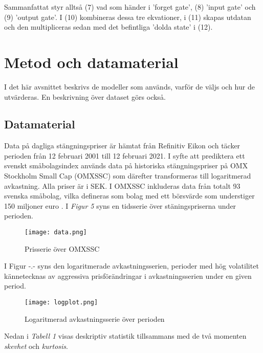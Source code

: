 \documentclass[12pt]{article}
\begin{document}
Sammanfattat styr alltså (7) vad som händer i 'forget gate', (8) 'input gate' och (9) 'output gate'. I (10) kombineras dessa tre ekvationer, i (11) skapas utdatan och den multipliceras sedan med det befintliga 'dolda state' i (12). 


\section{Metod och datamaterial}
I det här avsnittet beskrivs de modeller som används, varför de väljs och hur de utvärderas. En beskrivning över dataset görs också. 

\subsection{Datamaterial}

Data på dagliga stängningspriser är hämtat från Refinitiv Eikon och täcker perioden från 12 februari 2001 till 12 februari 2021. I syfte att prediktera ett svenskt småbolagsindex används data på historiska stängningspriser på OMX Stockholm Small Cap (OMXSSC) som därefter transformeras till logaritmerad avkastning. Alla priser är i SEK. I OMXSSC inkluderas data från totalt 93 svenska småbolag, vilka defineras som bolag med ett börsvärde som understiger 150 miljoner euro \parencite{smabalagsdefinition}. I \emph{Figur 5} syns en tidsserie över stäningspriserna under perioden.

\begin{figure}[H]
\caption{Prisserie över OMXSSC}
\texttt{[image: data.png]}
\centering
\end{figure}

I Figur -.- syns den logaritmerade avkastningsserien, perioder med hög volatilitet kännetecknas av aggressiva prisförändringar i avkastningsserien under en given period.

\begin{figure}[H]
\caption{Logaritmerad avkastningsserie över perioden}
\texttt{[image: logplot.png]}
\centering
\end{figure}

Nedan i \emph{Tabell 1} visas deskriptiv statistik tillsammans med de två momenten \emph{skevhet} och \emph{kurtosis}. 

\begin{table}[H]
\caption{Deskprivtiv statistik och moment}
\end{table}
\end{document}
